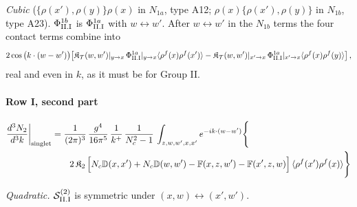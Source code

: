 \documentclass[10pt]{article}
\def\mf#1{\mathbb{#1}}
\begin{document}
\emph{Cubic} ($\{\rho(x'),\rho(y)\}\rho(x)$ in $N_{1a}$, type A12; $\rho(x)\{\rho(x'),\rho(y)\}$ in $N_{1b}$, type A23). $\Phi^{1b}_{\rm II.I}$ is $\Phi^{1a}_{\rm II.I}$ with $w\leftrightarrow w'$. After $w\leftrightarrow w'$ in the $N_{1b}$ terms the four contact terms combine into
\begin{align}
2\cos\big(k\cdot(w-w')\big)\big[\mathfrak{K}_{\mathcal{T}}(w,w')|_{y\to x}\,\Phi^{1a}_{\rm II.I}|_{y\to x}\langle\rho^{f}(x)\rho^{f}(x')\rangle-\mathfrak{K}_{\mathcal{T}}(w,w')|_{x'\to x}\,\Phi^{1a}_{\rm II.I}|_{x'\to x}\langle\rho^{f}(x)\rho^{f}(y)\rangle\big]\,,\notag
\end{align}
real and even in $k$, as it must be for Group II.
\paragraph*{Row I, second part}

\begin{align}
\frac{d^{3}N_{2}}{d^{3}k}\bigg|_{\rm singlet}&=\frac{1}{(2\pi)^{3}}\,\frac{g^{4}}{16\pi^{5}}\,\frac{1}{k^{+}}\,\frac{1}{N_{c}^{2}-1}\,\int_{z,w,w',x,x'}e^{-ik\cdot(w-w')}\Bigg\{\notag\\
&\qquad 2\,\mathfrak{K}_{2}\,\Big[N_{c}\mf{D}(x,x')+N_{c}\mf{D}(w,w')-\mf{F}(x,z,w')-\mf{F}(x',z,w)\Big]\,\langle\rho^{f}(x')\rho^{f}(x)\rangle\Bigg\}\label{eq:s-II-I-2}
\end{align}

\emph{Quadratic.} $\mathcal{S}^{(2)}_{\rm II.I}$ is symmetric under $(x,w)\leftrightarrow(x',w')$.
\end{document}
